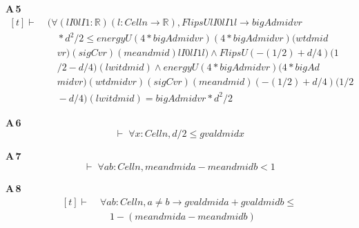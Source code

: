 \noindent\textbf{A\,5}\quad{}
{\footnotesize\[ \begin{aligned}[t]
\vdash\;&(\forall (\mathit{lI0} \mathit{lI1} : \mathbb{R} ) (\mathit{l} : \mathit{Cell} \mathit{n} \to \mathbb{R} ), \mathit{FlipsU} \mathit{lI0} \mathit{lI1} \mathit{l} \to \mathit{bigA} \mathit{d} \mathit{mid} \mathit{vr}\\
&\quad * \mathit{d} ^{2} / 2 \leq \mathit{energyU} (4 * \mathit{bigA} \mathit{d} \mathit{mid} \mathit{vr}) (4 * \mathit{bigA} \mathit{d} \mathit{mid} \mathit{vr}) (\mathit{wt} \mathit{d} \mathit{mid}\\
&\quad \mathit{vr}) (\mathit{sigC} \mathit{vr}) (\mathit{mean} \mathit{d} \mathit{mid}) \mathit{lI0} \mathit{lI1} \mathit{l}) \wedge \mathit{FlipsU} (-(1/2) + \mathit{d}/4) (1\\
&\quad /2 - \mathit{d}/4) (\mathit{lwit} \mathit{d} \mathit{mid}) \wedge \mathit{energyU} (4 * \mathit{bigA} \mathit{d} \mathit{mid} \mathit{vr}) (4 * \mathit{bigA} \mathit{d}\\
&\quad \mathit{mid} \mathit{vr}) (\mathit{wt} \mathit{d} \mathit{mid} \mathit{vr}) (\mathit{sigC} \mathit{vr}) (\mathit{mean} \mathit{d} \mathit{mid}) (-(1/2) + \mathit{d}/4) (1/2\\
&\quad - \mathit{d}/4) (\mathit{lwit} \mathit{d} \mathit{mid}) = \mathit{bigA} \mathit{d} \mathit{mid} \mathit{vr} * \mathit{d} ^{2} / 2
\end{aligned} \]}

\noindent\textbf{A\,6}\quad{}
{\footnotesize\[ \vdash\; \forall \mathit{x} : \mathit{Cell} \mathit{n}, \mathit{d} / 2 \leq \mathit{gval} \mathit{d} \mathit{mid} \mathit{x} \]}

\noindent\textbf{A\,7}\quad{}
{\footnotesize\[ \vdash\; \forall \mathit{a} \mathit{b} : \mathit{Cell} \mathit{n}, \mathit{mean} \mathit{d} \mathit{mid} \mathit{a} - \mathit{mean} \mathit{d} \mathit{mid} \mathit{b} < 1 \]}

\noindent\textbf{A\,8}\quad{}
{\footnotesize\[ \begin{aligned}[t]
\vdash\;&\forall \mathit{a} \mathit{b} : \mathit{Cell} \mathit{n}, \mathit{a} \neq \mathit{b} \to \mathit{gval} \mathit{d} \mathit{mid} \mathit{a} + \mathit{gval} \mathit{d} \mathit{mid} \mathit{b} \leq\\
&\quad 1 - (\mathit{mean} \mathit{d} \mathit{mid} \mathit{a} - \mathit{mean} \mathit{d} \mathit{mid} \mathit{b})
\end{aligned} \]}

